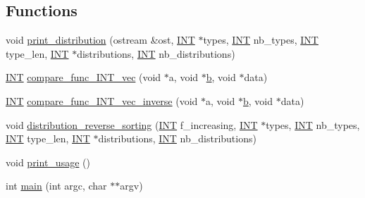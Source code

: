 \subsection*{Functions}
\begin{DoxyCompactItemize}
\item 
void \mbox{\hyperlink{tdo__refine_8_c_a3d4fe27380b7b1e19b559b17f0de36c1}{print\+\_\+distribution}} (ostream \&ost, \mbox{\hyperlink{galois_8h_a09fddde158a3a20bd2dcadb609de11dc}{I\+NT}} $\ast$types, \mbox{\hyperlink{galois_8h_a09fddde158a3a20bd2dcadb609de11dc}{I\+NT}} nb\+\_\+types, \mbox{\hyperlink{galois_8h_a09fddde158a3a20bd2dcadb609de11dc}{I\+NT}} type\+\_\+len, \mbox{\hyperlink{galois_8h_a09fddde158a3a20bd2dcadb609de11dc}{I\+NT}} $\ast$distributions, \mbox{\hyperlink{galois_8h_a09fddde158a3a20bd2dcadb609de11dc}{I\+NT}} nb\+\_\+distributions)
\item 
\mbox{\hyperlink{galois_8h_a09fddde158a3a20bd2dcadb609de11dc}{I\+NT}} \mbox{\hyperlink{tdo__refine_8_c_ae6bcc839277243c0461b66b59a5ed304}{compare\+\_\+func\+\_\+\+I\+N\+T\+\_\+vec}} (void $\ast$a, void $\ast$\mbox{\hyperlink{alphabet2_8_c_a148e3876077787926724625411d6e7a9}{b}}, void $\ast$data)
\item 
\mbox{\hyperlink{galois_8h_a09fddde158a3a20bd2dcadb609de11dc}{I\+NT}} \mbox{\hyperlink{tdo__refine_8_c_aeae33c96eccf9f071333b94bd44b7a33}{compare\+\_\+func\+\_\+\+I\+N\+T\+\_\+vec\+\_\+inverse}} (void $\ast$a, void $\ast$\mbox{\hyperlink{alphabet2_8_c_a148e3876077787926724625411d6e7a9}{b}}, void $\ast$data)
\item 
void \mbox{\hyperlink{tdo__refine_8_c_ab1b26f0f68b898ac92a61a98209a73d6}{distribution\+\_\+reverse\+\_\+sorting}} (\mbox{\hyperlink{galois_8h_a09fddde158a3a20bd2dcadb609de11dc}{I\+NT}} f\+\_\+increasing, \mbox{\hyperlink{galois_8h_a09fddde158a3a20bd2dcadb609de11dc}{I\+NT}} $\ast$types, \mbox{\hyperlink{galois_8h_a09fddde158a3a20bd2dcadb609de11dc}{I\+NT}} nb\+\_\+types, \mbox{\hyperlink{galois_8h_a09fddde158a3a20bd2dcadb609de11dc}{I\+NT}} type\+\_\+len, \mbox{\hyperlink{galois_8h_a09fddde158a3a20bd2dcadb609de11dc}{I\+NT}} $\ast$distributions, \mbox{\hyperlink{galois_8h_a09fddde158a3a20bd2dcadb609de11dc}{I\+NT}} nb\+\_\+distributions)
\item 
void \mbox{\hyperlink{tdo__refine_8_c_ae5ad5cbeccaedc03a48d3c7eaa803e79}{print\+\_\+usage}} ()
\item 
int \mbox{\hyperlink{tdo__refine_8_c_a3c04138a5bfe5d72780bb7e82a18e627}{main}} (int argc, char $\ast$$\ast$argv)
\end{DoxyCompactItemize}
